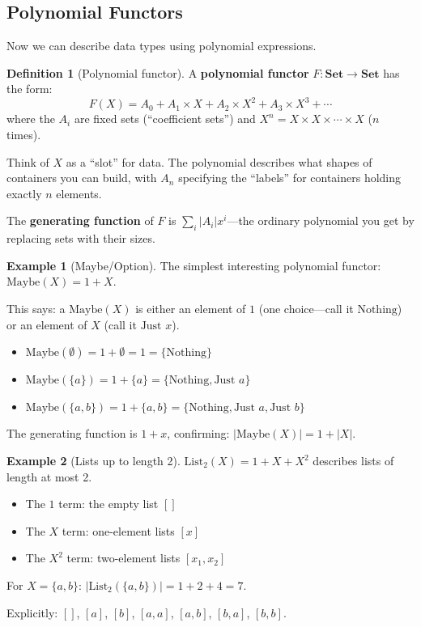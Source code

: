 \documentclass[11pt]{article}
\newcommand{\cat}[1]{\mathbf{#1}}
\newcommand{\Set}{\cat{Set}}
\theoremstyle{definition}
\newtheorem{definition}{Definition}[section]
\newtheorem{example}{Example}[section]
\theoremstyle{plain}
\theoremstyle{remark}
\begin{document}
\subsection{Polynomial Functors}

Now we can describe data types using polynomial expressions.

\begin{definition}[Polynomial functor]
A \textbf{polynomial functor} $F: \Set \to \Set$ has the form:
\[
F(X) = A_0 + A_1 \times X + A_2 \times X^2 + A_3 \times X^3 + \cdots
\]
where the $A_i$ are fixed sets (``coefficient sets'') and $X^n = X \times X \times \cdots \times X$ ($n$ times).
\end{definition}

Think of $X$ as a ``slot'' for data. The polynomial describes what shapes of containers you can build, with $A_n$ specifying the ``labels'' for containers holding exactly $n$ elements.

The \textbf{generating function} of $F$ is $\sum_i |A_i| x^i$---the ordinary polynomial you get by replacing sets with their sizes.

\begin{example}[Maybe/Option]
The simplest interesting polynomial functor: $\text{Maybe}(X) = 1 + X$.

This says: a $\text{Maybe}(X)$ is either an element of $1$ (one choice---call it $\text{Nothing}$) or an element of $X$ (call it $\text{Just } x$).
\begin{itemize}
  \item $\text{Maybe}(\emptyset) = 1 + \emptyset = 1 = \{\text{Nothing}\}$
  \item $\text{Maybe}(\{a\}) = 1 + \{a\} = \{\text{Nothing}, \text{Just } a\}$
  \item $\text{Maybe}(\{a, b\}) = 1 + \{a, b\} = \{\text{Nothing}, \text{Just } a, \text{Just } b\}$
\end{itemize}
The generating function is $1 + x$, confirming: $|\text{Maybe}(X)| = 1 + |X|$.
\end{example}

\begin{example}[Lists up to length 2]
$\text{List}_2(X) = 1 + X + X^2$ describes lists of length at most 2.
\begin{itemize}
  \item The $1$ term: the empty list $[]$
  \item The $X$ term: one-element lists $[x]$
  \item The $X^2$ term: two-element lists $[x_1, x_2]$
\end{itemize}

For $X = \{a, b\}$: $|\text{List}_2(\{a,b\})| = 1 + 2 + 4 = 7$.

Explicitly: $[]$, $[a]$, $[b]$, $[a,a]$, $[a,b]$, $[b,a]$, $[b,b]$.
\end{example}
\end{document}
